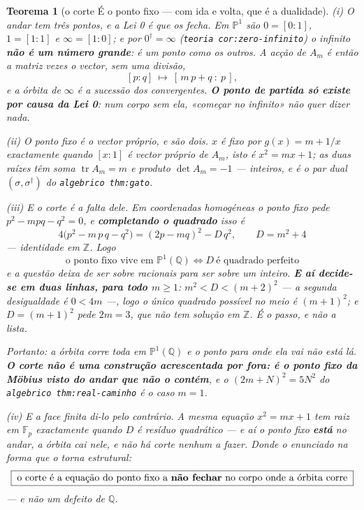 \documentclass[11pt,a4paper]{article}
\newcommand{\code}[1]{\texttt{\small #1}}
\newtheorem{teorema}{Teorema}
\begin{document}
\begin{teorema}[o corte É o ponto fixo --- com ida e volta, que é a
dualidade]
\emph{(i) O andar tem três pontos, e a Lei 0 é que os fecha.} Em $\mathbb{P}^1$ são
$0=[0:1]$, $1=[1:1]$ e $\infty=[1:0]$; e por $0^{\dagger}=\infty$
(\code{teoria cor:zero-infinito}) o infinito \textbf{não é um número grande}: é um ponto
como os outros. A acção de $A_m$ é então a matriz vezes o vector, \emph{sem uma
divisão},
\[
[p:q]\ \longmapsto\ [\,m\,p+q\ :\ p\,],
\]
e a órbita de $\infty$ é a sucessão dos convergentes. \textbf{O ponto de partida só
existe por causa da Lei 0}: num corpo sem ela, «começar no infinito» não quer dizer
nada.

\emph{(ii) O ponto fixo é o vector próprio, e são dois.} $x$ é fixo por $g(x)=m+1/x$
exactamente quando $[x:1]$ é vector próprio de $A_m$, isto é $x^{2}=mx+1$; as duas
raízes têm soma $\operatorname{tr}A_m=m$ e produto $\det A_m=-1$ --- \emph{inteiros},
e é o par dual $(\sigma,\sigma^{\dagger})$ do \code{algebrico thm:gato}.

\emph{(iii) E o corte é a falta dele.} Em coordenadas homogéneas o ponto fixo pede
$p^{2}-mpq-q^{2}=0$, e \textbf{completando o quadrado} isso é
\[
\boxed{\;4\bigl(p^{2}-m\,p\,q-q^{2}\bigr)=(2p-mq)^{2}-D\,q^{2},
\qquad D=m^{2}+4\;}
\]
--- identidade em $\mathbb{Z}$. Logo
\[
\boxed{\;\text{o ponto fixo vive em }\mathbb{P}^1(\mathbb{Q})
\iff D\ \text{é quadrado perfeito}\;}
\]
e a questão deixa de ser sobre racionais para ser sobre um inteiro. \textbf{E aí
decide-se em duas linhas, para todo $m\geq1$}: $m^{2}<D<(m+2)^{2}$ --- a segunda
desigualdade é $0<4m$ ---, logo o único quadrado possível no meio é $(m+1)^{2}$; e
$D=(m+1)^{2}$ pede $2m=3$, que não tem solução em $\mathbb{Z}$. \emph{É o passo, e
não a lista.}

Portanto: a órbita corre toda em $\mathbb{P}^1(\mathbb{Q})$ e o ponto para onde ela
vai não está lá. \textbf{O corte não é uma construção acrescentada por fora: é o
ponto fixo da Möbius visto do andar que não o contém}, e o
$(2m+N)^{2}=5N^{2}$ do \code{algebrico thm:real-caminho} é o caso $m=1$.

\emph{(iv) E a face finita di-lo pelo contrário.} A \emph{mesma} equação
$x^{2}=mx+1$ tem raiz em $\mathbb{F}_p$ exactamente quando $D$ é resíduo quadrático
--- e aí o ponto fixo \textbf{está} no andar, a órbita cai nele, e não há corte
nenhum a fazer. Donde o enunciado na forma que o torna estrutural:
\[
\boxed{\;\text{o corte é a equação do ponto fixo a \textbf{não fechar} no corpo onde
a órbita corre}\;}
\]
--- e não um defeito de $\mathbb{Q}$.


\end{teorema}
\end{document}
